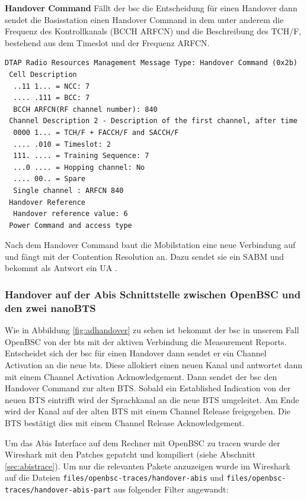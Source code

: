 \textbf{Handover Command}
Fällt der \gls{bsc} die Entscheidung für einen Handover dann sendet die Basisstation einen Handover Command in dem unter anderem die Frequenz des Kontrollkanals (\gls{BCCH} \gls{ARFCN}) und die Beschreibung des \gls{TCH/F}, bestehend aus dem Timeslot und der Frequenz \gls{ARFCN}.

\begin{lstlisting}[label=lst:handover-command,caption={Handover Command}]
DTAP Radio Resources Management Message Type: Handover Command (0x2b)
 Cell Description
  ..11 1... = NCC: 7
  .... .111 = BCC: 7
  BCCH ARFCN(RF channel number): 840
 Channel Description 2 - Description of the first channel, after time
  0000 1... = TCH/F + FACCH/F and SACCH/F
  .... .010 = Timeslot: 2
  111. .... = Training Sequence: 7
  ...0 .... = Hopping channel: No
  .... 00.. = Spare
  Single channel : ARFCN 840
 Handover Reference
  Handover reference value: 6
 Power Command and access type
\end{lstlisting}

Nach dem Handover Command baut die Mobilstation eine neue Verbindung auf und fängt mit der Contention Resolution an. Dazu sendet sie ein SABM und bekommt als Antwort ein UA \cite[5.4.1.4]{bib:3gpp0406}.



\subsubsection{Handover auf der Abis Schnittstelle zwischen OpenBSC und den zwei nanoBTS}

Wie in Abbildung \ref{fig:adhandover} zu sehen ist bekommt der \gls{bsc} in unserem Fall OpenBSC von der \gls{bts} mit der aktiven Verbindung die Measurement Reports. Entscheidet sich der \gls{bsc} für einen Handover dann sendet er ein Channel Activation an die neue \gls{bts}. Diese allokiert einen neuen Kanal und antwortet dann mit einem Channel Activation Acknowledgement. Dann sendet der \gls{bsc} den Handover Command zur alten BTS. Sobald ein Established Indication von der neuen BTS eintrifft wird der Sprachkanal an die neue BTS umgeleitet. Am Ende wird der Kanal auf der alten BTS mit einem Channel Release freigegeben. Die BTS bestätigt dies mit einem Channel Release Acknowledgement.

Um das Abis Interface auf dem Rechner mit OpenBSC zu tracen wurde der Wireshark mit den Patches gepatcht und kompiliert (siehe Abschnitt \ref{sec:abistrace}). Um nur die relevanten Pakete anzuzeigen wurde im Wireshark auf die Dateien \lstinline{files/openbsc-traces/handover-abis} und \lstinline{files/openbsc-traces/handover-abis-part} aus \cite{bib:githubfiles} folgender Filter angewandt:

